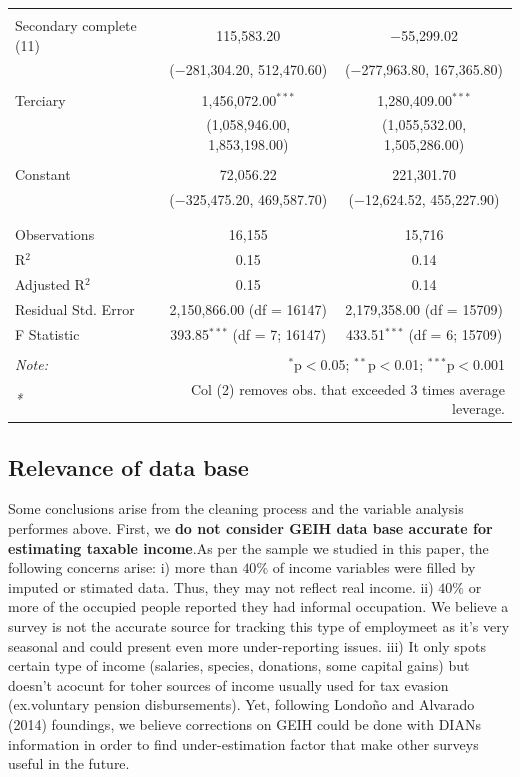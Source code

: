 \documentclass[a4paper,12pt]{article}
\begin{document}
\begin{table}[!htbp]
\begin{tabular}{@{\extracolsep{5pt}}lcc}
  & & \\ 
 Secondary complete (11) & 115,583.20 & $-$55,299.02 \\ 
  & ($-$281,304.20, 512,470.60) & ($-$277,963.80, 167,365.80) \\ 
  & & \\ 
 Terciary & 1,456,072.00$^{***}$ & 1,280,409.00$^{***}$ \\ 
  & (1,058,946.00, 1,853,198.00) & (1,055,532.00, 1,505,286.00) \\ 
  & & \\ 
 Constant & 72,056.22 & 221,301.70 \\ 
  & ($-$325,475.20, 469,587.70) & ($-$12,624.52, 455,227.90) \\ 
  & & \\ 
\hline \\[-1.8ex] 
Observations & 16,155 & 15,716 \\ 
R$^{2}$ & 0.15 & 0.14 \\ 
Adjusted R$^{2}$ & 0.15 & 0.14 \\ 
Residual Std. Error & 2,150,866.00 (df = 16147) & 2,179,358.00 (df = 15709) \\ 
F Statistic & 393.85$^{***}$ (df = 7; 16147) & 433.51$^{***}$ (df = 6; 15709) \\ 
\hline 
\hline \\[-1.8ex] 
\textit{Note:} & \multicolumn{2}{r}{$^{*}$p$<$0.05; $^{**}$p$<$0.01; $^{***}$p$<$0.001} \\  
\textit{*} & \multicolumn{2}{r}{ Col (2) removes obs. that exceeded 3 times average leverage.} \\
\end{tabular} 
\end{table} 

\subsection{ Relevance of data base}
Some conclusions arise from the cleaning process and the variable analysis performes above. First, we \textbf{do not consider GEIH data base accurate for estimating taxable income}.As per the sample we studied in this paper, the following concerns arise: i) more than $40\%$ of income variables were filled by imputed or stimated data. Thus, they may not reflect real income. ii) $40\%$ or more of the occupied people reported they had informal occupation. We believe a survey is not the accurate source for tracking this type of employmeet as it's very seasonal and could present even more under-reporting issues. iii) It only spots certain type of income (salaries, species, donations, some capital gains) but doesn't acocunt for toher sources of income usually used for tax evasion (ex.voluntary pension disbursements). Yet, following Londoño and Alvarado (2014) foundings, we believe corrections on GEIH could be done with DIANs information in order to find under-estimation factor that make other surveys useful in the future.
\end{document}
